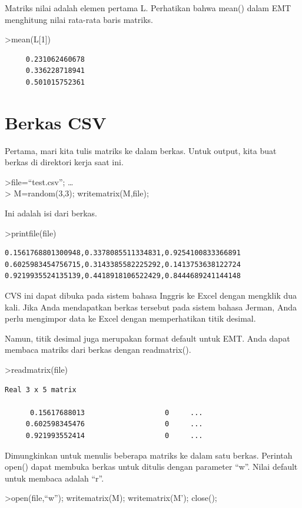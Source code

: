 \documentclass[
]{book}
\begin{document}
Matriks nilai adalah elemen pertama L. Perhatikan bahwa mean() dalam EMT menghitung nilai rata-rata baris matriks.

\textgreater mean(L{[}1{]})

\begin{verbatim}
     0.231062460678 
     0.336228718941 
     0.501015752361 
\end{verbatim}

\section{Berkas CSV}\label{berkas-csv}

Pertama, mari kita tulis matriks ke dalam berkas. Untuk output, kita buat berkas di direktori kerja saat ini.

\textgreater file=``test.csv''; \ldots{}\\
\textgreater{} M=random(3,3); writematrix(M,file);

Ini adalah isi dari berkas.

\textgreater printfile(file)

\begin{verbatim}
0.1561768801300948,0.3378085511334831,0.9254100833366891
0.6025983454756715,0.3143385582225292,0.1413753638122724
0.9219935524135139,0.4418918106522429,0.8444689241144148
\end{verbatim}

CVS ini dapat dibuka pada sistem bahasa Inggris ke Excel dengan mengklik dua kali. Jika Anda mendapatkan berkas tersebut pada sistem bahasa Jerman, Anda perlu mengimpor data ke Excel dengan memperhatikan titik desimal.

Namun, titik desimal juga merupakan format default untuk EMT. Anda dapat membaca matriks dari berkas dengan readmatrix().

\textgreater readmatrix(file)

\begin{verbatim}
Real 3 x 5 matrix

      0.15617688013                   0     ...
     0.602598345476                   0     ...
     0.921993552414                   0     ...
\end{verbatim}

Dimungkinkan untuk menulis beberapa matriks ke dalam satu berkas. Perintah open() dapat membuka berkas untuk ditulis dengan parameter ``w''. Nilai default untuk membaca adalah ``r''.

\textgreater open(file,``w''); writematrix(M); writematrix(M'); close();
\end{document}
